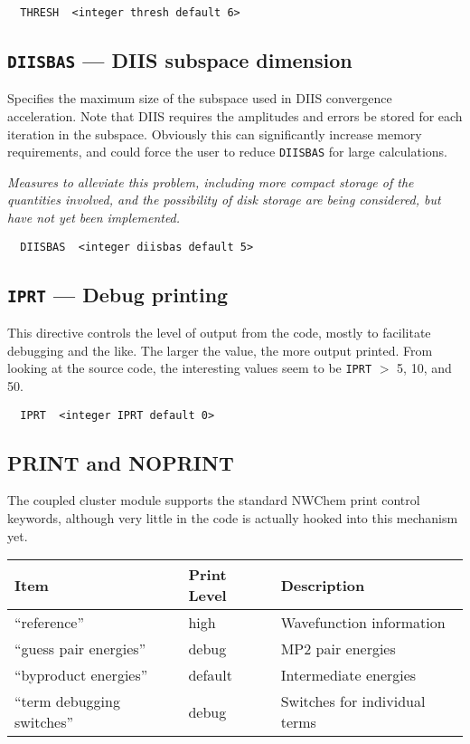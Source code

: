 \begin{verbatim}
  THRESH  <integer thresh default 6>
\end{verbatim}

\subsection{{\tt DIISBAS} --- DIIS subspace dimension}

Specifies the maximum size of the subspace used in DIIS convergence
acceleration.  Note that DIIS requires the amplitudes and errors be
stored for each iteration in the subspace.  Obviously this can
significantly increase memory requirements, and could force the user
to reduce \verb+DIISBAS+ for large calculations.

{\em Measures to alleviate this problem, including more compact
storage of the quantities involved, and the possibility of disk
storage are being considered, but have not yet been implemented.}

\begin{verbatim}
  DIISBAS  <integer diisbas default 5>
\end{verbatim}

\subsection{{\tt IPRT} --- Debug printing}

This directive controls the level of output from the code, mostly to
facilitate debugging and the like.  The larger the value, the more
output printed.  From looking at the source code, the interesting
values seem to be \verb+IPRT+ $>$ 5, 10, and 50.

\begin{verbatim}
  IPRT  <integer IPRT default 0>
\end{verbatim}

\subsection{PRINT and NOPRINT}

The coupled cluster module supports the standard NWChem print control
keywords, although very little in the code is actually hooked into
this mechanism yet.

\begin{tabular}{lll}
\hline\hline
Item                    & Print Level   & Description \\
\hline
``reference''             & high          & Wavefunction information\\
``guess pair energies'' & debug & MP2 pair energies\\
``byproduct energies'' & default & Intermediate energies   \\
``term debugging switches'' & debug & Switches for individual terms \\
\hline\hline
\end{tabular}


